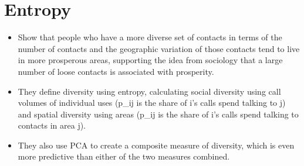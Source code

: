 

\section{Entropy}%
\label{sec:entropy}

\citet{eagle2010network}
\begin{itemize}
    \item Show that people who have a more diverse set of contacts in terms of
        the number of contacts and the geographic variation of those contacts
        tend to live in more prosperous areas, supporting the idea from
        sociology that a large number of loose contacts is associated with
        prosperity.

    \item They define diversity using entropy, calculating social diversity
        using call volumes of individual uses (p_ij is the share of i's calls
        spend talking to j) and spatial diversity using areas (p_ij is the
        share of i's calls spend talking to contacts in area j).

    \item They also use PCA to create a composite measure of diversity, which
        is even more predictive than either of the two measures combined.
\end{itemize}



